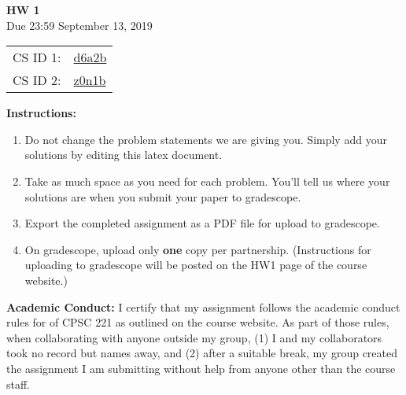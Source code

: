 \documentclass[11pt]{article}
\begin{document}

\begin{center}
    \LARGE
    \textbf{HW 1}
    \\[1ex]
    \Large Due 23:59 September 13, 2019 \\
\end{center}
\LARGE
\begin{tabular}{rl}
CS ID 1: & \underline{d6a2b}\\
CS ID 2: & \underline{z0n1b}\\
\end{tabular}
\large

\textbf{Instructions:}
\begin{enumerate}
\item Do not change the problem statements we are giving you. Simply add your solutions by editing this latex document. 
\item Take as much space as you need for each problem. You'll tell us where your solutions are when you submit your paper to gradescope. 
\item Export the completed assignment as a PDF file for upload to gradescope.
\item On gradescope, upload only \textbf{one} copy per partnership. (Instructions for uploading to gradescope will be posted on the HW1 page of the course website.)
\end{enumerate}

\textbf{Academic Conduct:} 
I certify that my assignment follows the academic conduct rules for of CPSC 221 as outlined on the course website. As part of those rules, when collaborating with anyone outside my group, (1) I and my collaborators took no record but names away, and (2) after a suitable break, my group created the assignment I am submitting without help from anyone other than the course staff. \\
\newpage
\end{document}
